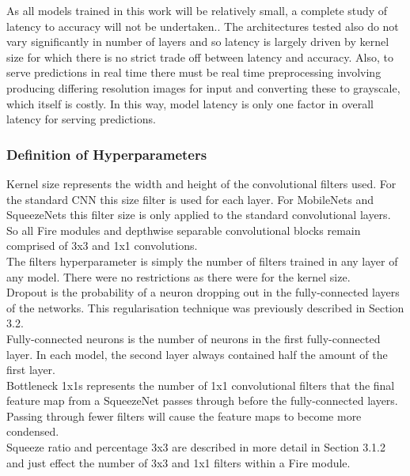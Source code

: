 \documentclass{article}
\begin{document}
As all models trained in this work will be relatively small, a complete study of latency to accuracy will not be undertaken.. The architectures tested also do not vary significantly in number of layers and so latency is largely driven by kernel size for which there is no strict trade off between latency and accuracy. Also, to serve predictions in real time there must be real time preprocessing involving producing differing resolution images for input and converting these to grayscale, which itself is costly. In this way, model latency is only one factor in overall latency for serving predictions. \\

\subsubsection{Definition of Hyperparameters}
Kernel size represents the width and height of the convolutional filters used. For the standard CNN this size filter is used for each layer. For MobileNets and SqueezeNets this filter size is only applied to the standard convolutional layers. So all Fire modules and depthwise separable convolutional blocks remain comprised of 3x3 and 1x1 convolutions. \\

The filters hyperparameter is simply the number of filters trained in any layer of any model. There were no restrictions as there were for the kernel size. \\

Dropout is the probability of a neuron dropping out in the fully-connected layers of the networks. This regularisation technique was previously described in Section 3.2. \\ 

Fully-connected neurons is the number of neurons in the first fully-connected layer. In each model, the second layer always contained half the amount of the first layer. \\

Bottleneck 1x1s represents the number of 1x1 convolutional filters that the final feature map from a SqueezeNet passes through before the fully-connected layers. Passing through fewer filters will cause the feature maps to become more condensed. \\

Squeeze ratio and percentage 3x3 are described in more detail in Section 3.1.2 and just effect the number of 3x3 and 1x1 filters within a Fire module.
\end{document}
